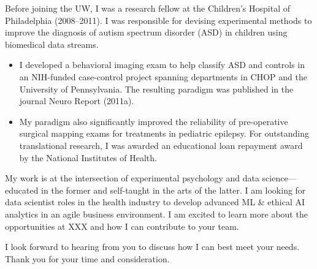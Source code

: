 \documentclass[11pt, letterpaper]{russell}
\begin{document}
\begin{cvletter}
  Before joining the UW, I was a research fellow at the Children's Hospital of Philadelphia (2008--2011). I was responsible for devising experimental methods to improve the diagnosis of autism spectrum disorder (ASD) in children using biomedical data streams.

  \begin{itemize}
    \item I developed a behavioral imaging exam to help classify ASD and controls in an NIH-funded case-control project spanning departments in CHOP and the University of Pennsylvania. The resulting paradigm was published in the journal Neuro Report (2011a).
    \item My paradigm also significantly improved the reliability of pre-operative surgical mapping exams for treatments in pediatric epilepsy. For outstanding translational research, I was awarded an educational loan repayment award by the National Institutes of Health.
  \end{itemize}

  My work is at the intersection of experimental psychology and data science---educated in the former and self-taught in the arts of the latter. I am looking for data scientist roles in the health industry to develop advanced ML \& ethical AI analytics in an agile business environment. I am excited to learn more about the opportunities at XXX and how I can contribute to your team.  %

  I look forward to hearing from you to discuss how I can best meet your needs. Thank you for your time and consideration.

\end{cvletter}

\makeletterclosing
\end{document}
